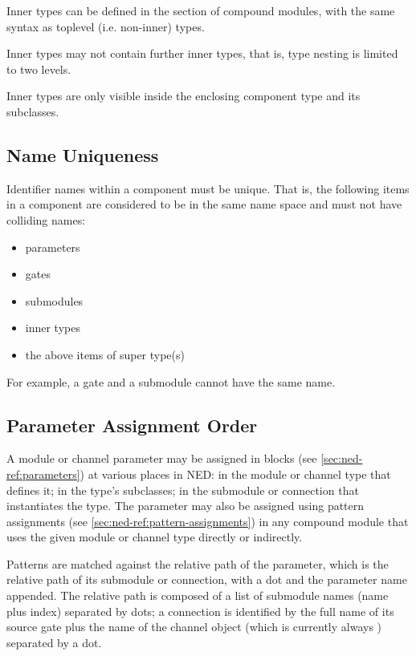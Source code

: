 {Inner types can be defined in the  section of compound
modules, with the same syntax as toplevel (i.e. non-inner) types.

Inner types may not contain further inner types, that is, type nesting
is limited to two levels.

Inner types are only visible inside the enclosing component type
and its subclasses.



\subsection{Name Uniqueness}
\label{sec:ned-ref:name-uniqueness}

Identifier names within a component must be unique. That is, the following
items in a component are considered to be in the same name space and must
not have colliding names:

\begin{itemize}
  \item parameters
  \item gates
  \item submodules
  \item inner types
  \item the above items of super type(s)
\end{itemize}

For example, a gate and a submodule cannot have the same name.


\subsection{Parameter Assignment Order}
\label{sec:ned-ref:param-assignment-order}

A module or channel parameter may be assigned in 
blocks (see \ref{sec:ned-ref:parameters}) at various places in NED: in
the module or channel type that defines it; in the type's subclasses; in
the submodule or connection that instantiates the type. The parameter may
also be assigned using pattern assignments (see
\ref{sec:ned-ref:pattern-assignments}) in any compound module that uses
the given module or channel type directly or indirectly.

Patterns are matched against the relative path of the parameter, which is
the relative path of its submodule or connection, with a dot and the
parameter name appended. The relative path is composed of a list of
submodule names (name plus index) separated by dots; a connection is
identified by the full name of its source gate plus the name of the channel
object (which is currently always ) separated by a dot.

}
